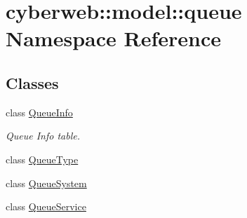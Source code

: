 \hypertarget{namespacecyberweb_1_1model_1_1queue}{\section{cyberweb\-:\-:model\-:\-:queue \-Namespace \-Reference}
\label{namespacecyberweb_1_1model_1_1queue}
}
\subsection*{\-Classes}
\begin{DoxyCompactItemize}
\item 
class \hyperlink{classcyberweb_1_1model_1_1queue_1_1_queue_info}{\-Queue\-Info}
\begin{DoxyCompactList}\small\item\em \-Queue \-Info table. \end{DoxyCompactList}\item 
class \hyperlink{classcyberweb_1_1model_1_1queue_1_1_queue_type}{\-Queue\-Type}
\item 
class \hyperlink{classcyberweb_1_1model_1_1queue_1_1_queue_system}{\-Queue\-System}
\item 
class \hyperlink{classcyberweb_1_1model_1_1queue_1_1_queue_service}{\-Queue\-Service}
\end{DoxyCompactItemize}
